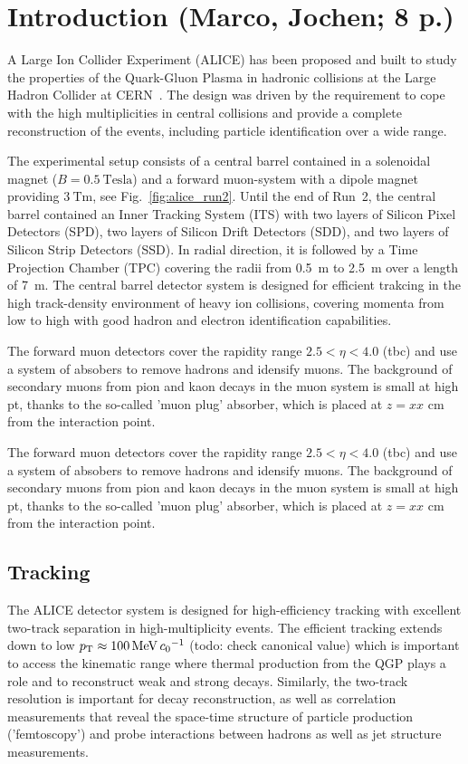 \section{Introduction (Marco, Jochen; 8 p.)}

A Large Ion Collider Experiment (ALICE) has been proposed and built to study
the properties of the Quark-Gluon Plasma in hadronic collisions at the Large
Hadron Collider at CERN~\cite{Aamodt:2008zz}. The design was driven by the
requirement to cope with the high multiplicities in central \PbPb collisions
and provide a complete reconstruction of the events, including particle
identification over a wide \pt range.

The experimental setup consists of a central barrel contained in a solenoidal
magnet ($B = 0.5~\mathrm{Tesla}$) and a forward muon-system with a dipole magnet
providing $3~\mathrm{Tm}$, see Fig.~\ref{fig:alice_run2}. Until the end of Run~2,
the central barrel contained an Inner Tracking System (ITS) with two layers of
Silicon Pixel Detectors (SPD), two layers of Silicon Drift Detectors (SDD), and
two layers of Silicon Strip Detectors (SSD). In radial direction, it is followed
by a Time Projection Chamber (TPC) covering the radii from 0.5~m to 2.5~m over a
length of 7~m.
The central barrel detector system is designed for efficient trakcing in the high track-density environment of heavy ion collisions, covering momenta from low to high \pt{} with good hadron and electron identification capabilities.

The forward muon detectors cover the rapidity range $2.5 < \eta < 4.0$ (tbc) and use a system of absobers to remove hadrons and idensify muons.
The background of secondary muons from pion and kaon decays in the muon system is small at high pt, thanks to the so-called 'muon plug' absorber, which is placed at $z = xx$ cm from the interaction point.

The forward muon detectors cover the rapidity range $2.5 < \eta < 4.0$ (tbc) and use a system of absobers to remove hadrons and idensify muons.
The background of secondary muons from pion and kaon decays in the muon system is small at high pt, thanks to the so-called 'muon plug' absorber, which is placed at $z = xx$ cm from the interaction point.

\subsection{Tracking}

The ALICE detector system is designed for high-efficiency tracking with excellent two-track separation in high-multiplicity events. The efficient tracking extends down to low $\pt \approx \SI{100}{\mega\eV\per\clight}$ (todo: check canonical value) which is important to access the kinematic range where thermal production from the QGP plays a role and to reconstruct weak and strong decays.
Similarly, the two-track resolution is important for decay reconstruction, as well as correlation measurements that reveal the space-time structure of particle production ('femtoscopy') and probe interactions between hadrons as well as jet structure measurements.

